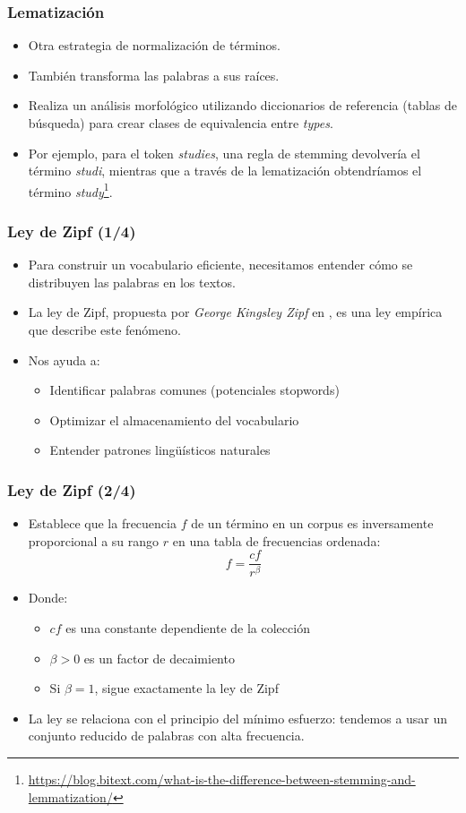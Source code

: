\documentclass[handout]{beamer}
\begin{document}
\begin{frame}\frametitle{Lematización}
\begin{itemize}
\item Otra estrategia de normalización de términos.
 \item También transforma las palabras a sus raíces.
 \item Realiza un análisis morfológico utilizando diccionarios de referencia (tablas de búsqueda) para crear clases de equivalencia entre \emph{types}.
\item Por ejemplo, para el token \emph{studies}, una regla de stemming devolvería el término \emph{studi}, mientras que a través de la lematización obtendríamos el término \emph{study}\footnote{\url{https://blog.bitext.com/what-is-the-difference-between-stemming-and-lemmatization/}}. 

\end{itemize}
\end{frame}



\begin{frame}\frametitle{Ley de Zipf (1/4)}
\begin{itemize}
\item Para construir un vocabulario eficiente, necesitamos entender cómo se distribuyen las palabras en los textos.
\item La ley de Zipf, propuesta por \emph{George Kingsley Zipf} en \cite{zipf1935}, es una ley empírica que describe este fenómeno.
\item Nos ayuda a:
  \begin{itemize}
    \item Identificar palabras comunes (potenciales stopwords)
    \item Optimizar el almacenamiento del vocabulario
    \item Entender patrones lingüísticos naturales
  \end{itemize}
\end{itemize}
\end{frame}

\begin{frame}\frametitle{Ley de Zipf (2/4)}
\begin{itemize}
\item Establece que la frecuencia $f$ de un término en un corpus es inversamente proporcional a su rango $r$ en una tabla de frecuencias ordenada:
\begin{equation}
	f = \frac{cf}{r^{\beta}}
\end{equation}
\item Donde:
  \begin{itemize}
    \item $cf$ es una constante dependiente de la colección
    \item $\beta > 0$ es un factor de decaimiento
    \item Si $\beta = 1$, sigue exactamente la ley de Zipf
  \end{itemize}
\item La ley se relaciona con el principio del mínimo esfuerzo: tendemos a usar un conjunto reducido de palabras con alta frecuencia.
\end{itemize}
\end{frame}
\end{document}
